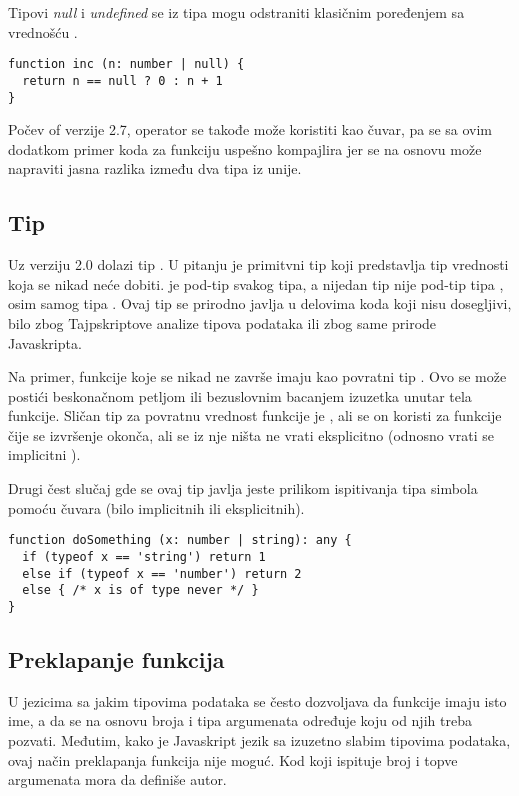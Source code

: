 Tipovi \textit{null} i \textit{undefined} se iz tipa mogu odstraniti klasičnim poređenjem sa vrednošću .

\begin{verbatim}
function inc (n: number | null) {
  return n == null ? 0 : n + 1
}
\end{verbatim}

Počev of verzije 2.7, operator  se takođe može koristiti kao čuvar, pa se sa ovim dodatkom primer koda za funkciju  uspešno kompajlira jer se na osnovu  može napraviti jasna razlika između dva tipa iz unije. 

\subsection{Tip }

Uz verziju 2.0 dolazi tip .
U pitanju je primitvni tip koji predstavlja tip vrednosti koja se nikad neće dobiti.
 je pod-tip svakog tipa, a nijedan tip nije pod-tip tipa , osim samog tipa .
Ovaj tip se prirodno javlja u delovima koda koji nisu dosegljivi, bilo zbog Tajpskriptove analize tipova podataka ili zbog same prirode Javaskripta.

Na primer, funkcije koje se nikad ne završe imaju kao povratni tip .
Ovo se može postići beskonačnom petljom ili bezuslovnim bacanjem izuzetka unutar tela funkcije.
Sličan tip za povratnu vrednost funkcije je , ali se on koristi za funkcije čije se izvršenje okonča, ali se iz nje ništa ne vrati eksplicitno (odnosno vrati se implicitni ).

Drugi čest slučaj gde se ovaj tip javlja jeste prilikom ispitivanja tipa simbola pomoću čuvara (bilo implicitnih ili eksplicitnih).

\begin{verbatim}
function doSomething (x: number | string): any {
  if (typeof x == 'string') return 1
  else if (typeof x == 'number') return 2
  else { /* x is of type never */ }
}
\end{verbatim}

\subsection{Preklapanje funkcija}

U jezicima sa jakim tipovima podataka se često dozvoljava da funkcije imaju isto ime, a da se na osnovu broja i tipa argumenata određuje koju od njih treba pozvati.
Međutim, kako je Javaskript jezik sa izuzetno slabim tipovima podataka, ovaj način preklapanja funkcija nije moguć.
Kod koji ispituje broj i topve argumenata mora da definiše autor.

